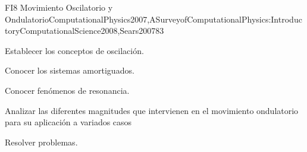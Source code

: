\begin{syllabus}
\begin{unit}{FI8 Movimiento Oscilatorio y Ondulatorio}{ComputationalPhysics2007,ASurveyofComputationalPhysics:IntroductoryComputationalScience2008,Sears2007}{8}{3}
   \begin{learningoutcomes}
      \item Establecer los conceptos de oscilación.
      \item Conocer los sistemas amortiguados.
      \item Conocer fenómenos de resonancia.
      \item Analizar las diferentes magnitudes que intervienen en el movimiento ondulatorio para su aplicación a variados casos
      \item Resolver problemas.
   \end{learningoutcomes}
\end{unit}



\begin{coursebibliography}
\end{coursebibliography}

\end{syllabus}

